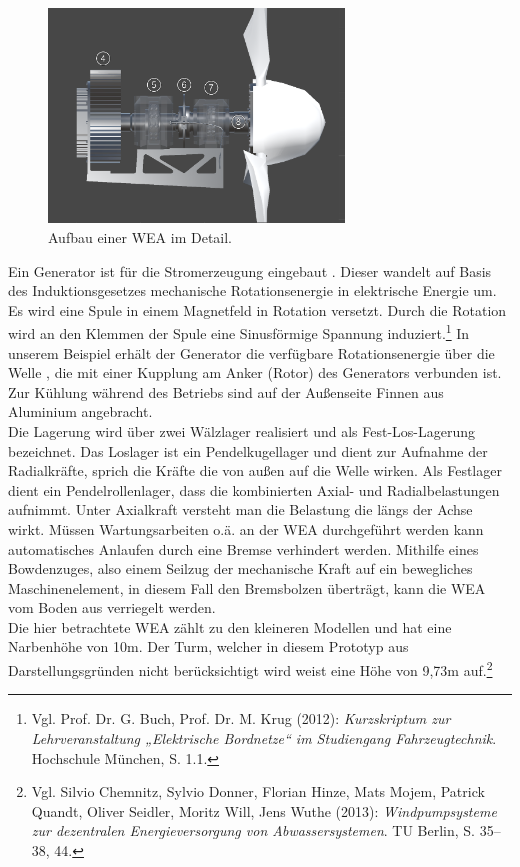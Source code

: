 \begin{figure}[H]
	\centering
	\captionsetup{width=0.7\textwidth}
	\includegraphics[keepaspectratio, width=0.7\textwidth]{bildquellen/WEA2_2}
	\caption{Aufbau einer WEA im Detail.}
	\label{fig:2}
\end{figure}

Ein Generator ist für die Stromerzeugung eingebaut . Dieser wandelt auf Basis des Induktionsgesetzes mechanische Rotationsenergie in elektrische Energie um. Es wird eine Spule in einem Magnetfeld in Rotation versetzt. Durch die Rotation wird an den Klemmen der Spule eine Sinusförmige Spannung induziert.\footnote{Vgl. Prof. Dr. G. Buch, Prof. Dr. M. Krug  (2012): \textit{Kurzskriptum zur Lehrveranstaltung „Elektrische Bordnetze“ im Studiengang Fahrzeugtechnik}. Hochschule München, S. 1.1.} In unserem Beispiel erhält der Generator die verfügbare Rotationsenergie über die Welle , die mit einer Kupplung am Anker (Rotor) des Generators verbunden ist. Zur Kühlung während des Betriebs sind auf der Außenseite Finnen aus Aluminium angebracht.\\
Die Lagerung wird über zwei Wälzlager realisiert und als Fest-Los-Lagerung bezeichnet. Das Loslager ist ein Pendelkugellager  und dient zur Aufnahme der Radialkräfte, sprich die Kräfte die von außen auf die Welle wirken. Als Festlager dient ein Pendelrollenlager,  dass die kombinierten Axial- und Radialbelastungen aufnimmt. Unter Axialkraft versteht man die Belastung die längs der Achse wirkt.
Müssen Wartungsarbeiten o.ä. an der WEA durchgeführt werden kann automatisches Anlaufen durch eine Bremse  verhindert werden. Mithilfe eines Bowdenzuges, also einem Seilzug der mechanische Kraft auf ein bewegliches Maschinenelement, in diesem Fall den Bremsbolzen überträgt, kann die WEA vom Boden aus verriegelt werden. \\
Die hier betrachtete WEA zählt zu den kleineren Modellen und hat eine Narbenhöhe von 10m. Der Turm, welcher in diesem Prototyp aus Darstellungsgründen nicht berücksichtigt wird weist eine Höhe von 9,73m auf.\footnote{Vgl. Silvio Chemnitz, Sylvio Donner, Florian Hinze, Mats Mojem, Patrick Quandt, Oliver Seidler, Moritz Will, Jens Wuthe (2013): \textit{Windpumpsysteme zur dezentralen Energieversorgung von Abwassersystemen}. TU Berlin, S. 35--38, 44.} 
   



